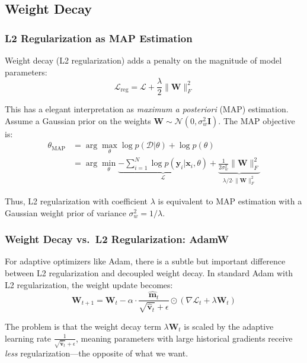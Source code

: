 \subsection{Weight Decay}
\label{sec:weight_decay}

\subsubsection{L2 Regularization as MAP Estimation}

Weight decay (L2 regularization) adds a penalty on the magnitude of model parameters:
\begin{equation}
\mathcal{L}_{\text{reg}} = \mathcal{L} + \frac{\lambda}{2}\|\mathbf{W}\|_F^2
\end{equation}

This has a elegant interpretation as \emph{maximum a posteriori} (MAP) estimation. Assume a Gaussian prior on the weights $\mathbf{W} \sim \mathcal{N}(0, \sigma_w^2 \mathbf{I})$. The MAP objective is:
\begin{align}
\theta_{\text{MAP}} &= \arg\max_\theta \log p(\mathcal{D} | \theta) + \log p(\theta) \\
&= \arg\min_\theta \underbrace{-\sum_{i=1}^N \log p(\mathbf{y}_i | \mathbf{x}_i, \theta)}_{\mathcal{L}} + \underbrace{\frac{1}{2\sigma_w^2}\|\mathbf{W}\|_F^2}_{\lambda/2 \cdot \|\mathbf{W}\|_F^2}
\end{align}

Thus, L2 regularization with coefficient $\lambda$ is equivalent to MAP estimation with a Gaussian weight prior of variance $\sigma_w^2 = 1/\lambda$.

\subsubsection{Weight Decay vs.\ L2 Regularization: AdamW}

For adaptive optimizers like Adam, there is a subtle but important difference between L2 regularization and decoupled weight decay. In standard Adam with L2 regularization, the weight update becomes:
\begin{equation}
\mathbf{W}_{t+1} = \mathbf{W}_t - \alpha \cdot \frac{\hat{\mathbf{m}}_t}{\sqrt{\hat{\mathbf{v}}_t} + \epsilon} \odot \left(\nabla \mathcal{L}_t + \lambda \mathbf{W}_t\right)
\end{equation}

The problem is that the weight decay term $\lambda \mathbf{W}_t$ is scaled by the adaptive learning rate $\frac{1}{\sqrt{\hat{\mathbf{v}}_t} + \epsilon}$, meaning parameters with large historical gradients receive \emph{less} regularization---the opposite of what we want.

